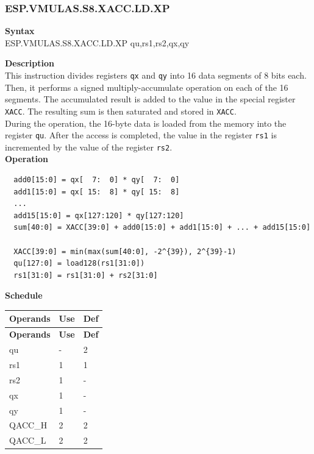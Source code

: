 \newpage
\subsubsection{ESP.VMULAS.S8.XACC.LD.XP}\label{instruction:ESPVMULASS8XACCLDXP}
\textbf{Syntax}\\
ESP.VMULAS.S8.XACC.LD.XP qu,rs1,rs2,qx,qy

\textbf{Description}\\

This instruction divides registers \lstinline{qx} and \lstinline{qy} into 16 data segments of 8 bits each. Then, it performs a signed multiply-accumulate operation on each of the 16 segments. The accumulated result is added to the value in the special register \lstinline{XACC}. The resulting sum is then saturated and stored in \lstinline{XACC}. \\ During the operation, the 16-byte data is loaded from the memory into the register \lstinline{qu}. After the access is completed, the value in the register \lstinline{rs1} is incremented by the value of the register \lstinline{rs2}.\\
\textbf{Operation}
\begin{lstlisting}
  add0[15:0] = qx[  7:  0] * qy[  7:  0]
  add1[15:0] = qx[ 15:  8] * qy[ 15:  8]
  ...
  add15[15:0] = qx[127:120] * qy[127:120]
  sum[40:0] = XACC[39:0] + add0[15:0] + add1[15:0] + ... + add15[15:0]

  XACC[39:0] = min(max(sum[40:0], -2^{39}), 2^{39}-1)
  qu[127:0] = load128(rs1[31:0])
  rs1[31:0] = rs1[31:0] + rs2[31:0]
\end{lstlisting}

\textbf{Schedule}\\
\begin{longtable}[c]{|l|l|l|}
    \hline
    \rowcolor{lightgray}
    \textbf{Operands} & \textbf{Use} & \textbf{Def} \\\hline
    \endfirsthead
    \hline
    \rowcolor{lightgray}
     \textbf{Operands} & \textbf{Use} & \textbf{Def} \\\hline
    \endhead
    \hline
    \endfoot

    qu & - & 2 \\\hline
    rs1 & 1 & 1 \\\hline
    rs2 & 1 & - \\\hline
     qx & 1 & - \\\hline
     qy & 1 & - \\\hline
     QACC\_H & 2 & 2 \\\hline
     QACC\_L & 2 & 2

\end{longtable}

